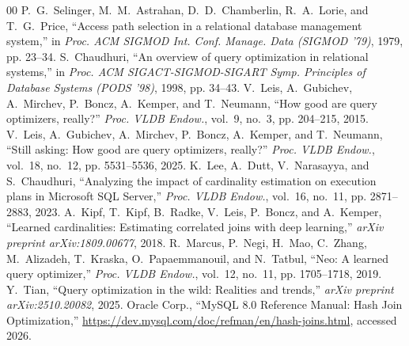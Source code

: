 \documentclass[conference]{IEEEtran}
\begin{document}
\begin{thebibliography}{00}
 P.~G.~Selinger, M.~M.~Astrahan, D.~D.~Chamberlin, R.~A.~Lorie, and T.~G.~Price, ``Access path selection in a relational database management system,'' in \emph{Proc. ACM SIGMOD Int. Conf. Manage. Data (SIGMOD '79)}, 1979, pp. 23--34.
 S.~Chaudhuri, ``An overview of query optimization in relational systems,'' in \emph{Proc. ACM SIGACT-SIGMOD-SIGART Symp. Principles of Database Systems (PODS '98)}, 1998, pp. 34--43.
 V.~Leis, A.~Gubichev, A.~Mirchev, P.~Boncz, A.~Kemper, and T.~Neumann, ``How good are query optimizers, really?'' \emph{Proc. VLDB Endow.}, vol.~9, no.~3, pp. 204--215, 2015.
 V.~Leis, A.~Gubichev, A.~Mirchev, P.~Boncz, A.~Kemper, and T.~Neumann, ``Still asking: How good are query optimizers, really?'' \emph{Proc. VLDB Endow.}, vol.~18, no.~12, pp. 5531--5536, 2025.
 K.~Lee, A.~Dutt, V.~Narasayya, and S.~Chaudhuri, ``Analyzing the impact of cardinality estimation on execution plans in Microsoft SQL Server,'' \emph{Proc. VLDB Endow.}, vol.~16, no.~11, pp. 2871--2883, 2023.
 A.~Kipf, T.~Kipf, B.~Radke, V.~Leis, P.~Boncz, and A.~Kemper, ``Learned cardinalities: Estimating correlated joins with deep learning,'' \emph{arXiv preprint arXiv:1809.00677}, 2018.
 R.~Marcus, P.~Negi, H.~Mao, C.~Zhang, M.~Alizadeh, T.~Kraska, O.~Papaemmanouil, and N.~Tatbul, ``Neo: A learned query optimizer,'' \emph{Proc. VLDB Endow.}, vol.~12, no.~11, pp. 1705--1718, 2019.
 Y.~Tian, ``Query optimization in the wild: Realities and trends,'' \emph{arXiv preprint arXiv:2510.20082}, 2025.
 Oracle Corp., ``MySQL 8.0 Reference Manual: Hash Join Optimization,'' \url{https://dev.mysql.com/doc/refman/en/hash-joins.html}, accessed 2026.
\end{thebibliography}
\end{document}
